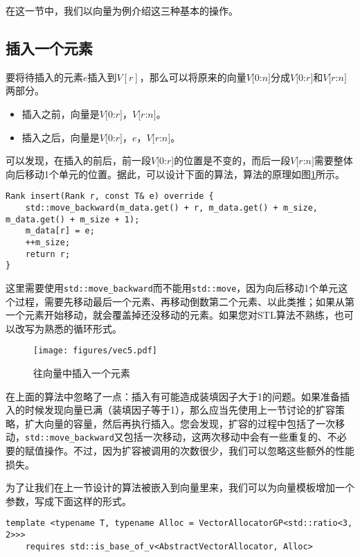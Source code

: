 在这一节中，我们以向量为例介绍这三种基本的操作。

\subsection{插入一个元素}
\label{sec:插入一个元素}
要将待插入的元素$e$插入到$V[r]$，那么可以将原来的向量$V[0$:$n]$分成$V[0$:$r]$和$V[r$:$n]$两部分。

\begin{itemize}
    \item 插入之前，向量是$V[0$:$r]$，$V[r$:$n]$。
    \item 插入之后，向量是$V[0$:$r]$，$e$，$V[r$:$n]$。
\end{itemize}


可以发现，在插入的前后，前一段$V[0$:$r]$的位置是不变的，而后一段$V[r$:$n]$需要整体向后移动1个单元的位置。据此，可以设计下面的算法，算法的原理如图\ref{fig:vec5}所示。

\begin{lstlisting}
Rank insert(Rank r, const T& e) override {
    std::move_backward(m_data.get() + r, m_data.get() + m_size, m_data.get() + m_size + 1);
    m_data[r] = e;
    ++m_size;
    return r;
}
\end{lstlisting}

这里需要使用\lstinline{std::move_backward}而不能用\lstinline{std::move}，因为向后移动1个单元这个过程，需要先移动最后一个元素、再移动倒数第二个元素、以此类推；如果从第一个元素开始移动，就会覆盖掉还没移动的元素。如果您对STL算法不熟练，也可以改写为熟悉的循环形式。

\begin{figure}
  \centering
  \texttt{[image: figures/vec5.pdf]}
  \caption{往向量中插入一个元素}
  \label{fig:vec5}
\end{figure}


在上面的算法中忽略了一点：插入有可能造成装填因子大于1的问题。如果准备插入的时候发现向量已满（装填因子等于1），那么应当先使用上一节讨论的扩容策略，扩大向量的容量，然后再执行插入。您会发现，扩容的过程中包括了一次移动，\lstinline{std::move_backward}又包括一次移动，这两次移动中会有一些重复的、不必要的赋值操作。不过，因为扩容被调用的次数很少，我们可以忽略这些额外的性能损失。

为了让我们在上一节设计的算法被嵌入到向量里来，我们可以为向量模板增加一个参数，写成下面这样的形式。

\begin{lstlisting}
template <typename T, typename Alloc = VectorAllocatorGP<std::ratio<3, 2>>>
    requires std::is_base_of_v<AbstractVectorAllocator, Alloc>
\end{lstlisting}

